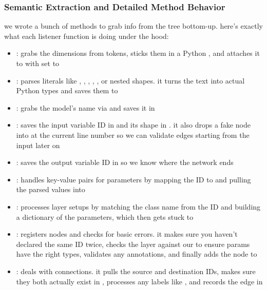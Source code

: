 \documentclass{nngraph-en}
\begin{document}
\subsubsection{Semantic Extraction and Detailed Method Behavior}

we wrote a bunch of  methods to grab info from the tree bottom-up. here's exactly what each listener function is doing under the hood:

\begin{itemize}
    \item \textbf{}: grabs the dimensions from  tokens, sticks them in a Python , and attaches it to  with  set to 
    \item \textbf{}: parses literals like , , , , , or nested shapes. it turns the text into actual Python types and saves them to 
    \item \textbf{}: grabs the model's name via  and saves it in 
    \item \textbf{}: saves the input variable ID in  and its shape in . it also drops a fake  node into  at the current line number so we can validate edges starting from the input later on
    \item \textbf{}: saves the output variable ID in  so we know where the network ends
    \item \textbf{}: handles key-value pairs for parameters by mapping the ID to  and pulling the parsed values into 
    \item \textbf{}: processes layer setups by matching the class name from the ID and building a dictionary of the parameters, which then gets stuck to 
    \item \textbf{}: registers nodes and checks for basic errors. it makes sure you haven't declared the same ID twice, checks the layer against our  to ensure params have the right types, validates any  annotations, and finally adds the node to 
    \item \textbf{}: deals with connections. it pulls the source and destination IDs, makes sure they both actually exist in , processes any labels like , and records the edge in 

\end{itemize}
\end{document}

